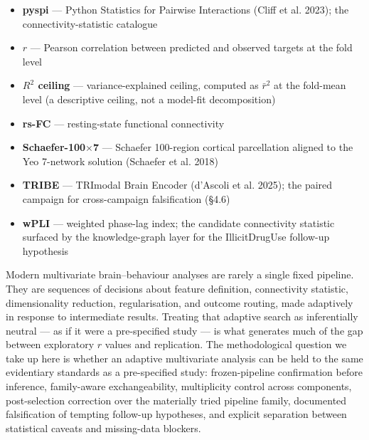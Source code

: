 \documentclass[11pt,letterpaper]{report}
\begin{document}
\begin{itemize}[leftmargin=1.6em,itemsep=0.2em]
  \item \textbf{pyspi} --- Python Statistics for Pairwise Interactions (Cliff et al. 2023); the connectivity-statistic catalogue
  \item \textbf{$r$} --- Pearson correlation between predicted and observed targets at the fold level
  \item \textbf{$R^2$ ceiling} --- variance-explained ceiling, computed as $\bar{r}^2$ at the fold-mean level (a descriptive ceiling, not a model-fit decomposition)
  \item \textbf{rs-FC} --- resting-state functional connectivity
  \item \textbf{Schaefer-100$\times$7} --- Schaefer 100-region cortical parcellation aligned to the Yeo 7-network solution (Schaefer et al. 2018)
  \item \textbf{TRIBE} --- TRImodal Brain Encoder (d'Ascoli et al. 2025); the paired campaign for cross-campaign falsification (\S4.6)
  \item \textbf{wPLI} --- weighted phase-lag index; the candidate connectivity statistic surfaced by the knowledge-graph layer for the IllicitDrugUse follow-up hypothesis
\end{itemize}



Modern multivariate brain--behaviour analyses are rarely a single fixed pipeline. They are sequences of decisions about feature definition, connectivity statistic, dimensionality reduction, regularisation, and outcome routing, made adaptively in response to intermediate results. Treating that adaptive search as inferentially neutral --- as if it were a pre-specified study --- is what generates much of the gap between exploratory $r$ values and replication. The methodological question we take up here is whether an adaptive multivariate analysis can be held to the same evidentiary standards as a pre-specified study: frozen-pipeline confirmation before inference, family-aware exchangeability, multiplicity control across components, post-selection correction over the materially tried pipeline family, documented falsification of tempting follow-up hypotheses, and explicit separation between statistical caveats and missing-data blockers.
\end{document}
